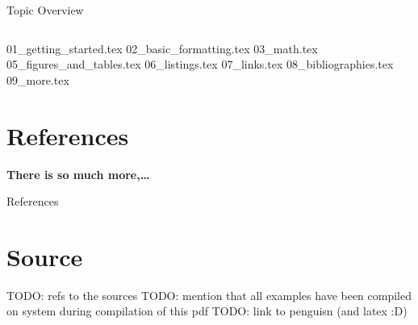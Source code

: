 



\begin{frame}{Topic Overview}
\begin{columns}[c,onlytextwidth]
\tableofcontents[sections={1-4}]
\tableofcontents[sections={5-8}]
\end{columns}
\end{frame}

{01_getting_started.tex}
{02_basic_formatting.tex}
{03_math.tex}
{05_figures_and_tables.tex}
{06_listings.tex}
{07_links.tex}
{08_bibliographies.tex}
{09_more.tex}

\appendix
\beginbackup

\section{References}

\begin{frame}[plain,c]{}
   \vspace*{4em}\centering\Large\bfseries There is so much more,\ldots
\end{frame}

\begin{frame}[allowframebreaks]{References}
\printbibliography
\end{frame}


\section{Source}
\begin{frame}
   TODO: refs to the sources
   TODO: mention that all examples have been compiled on system during compilation of this pdf
   TODO: link to penguisn (and latex :D)
\end{frame}
\backupend


